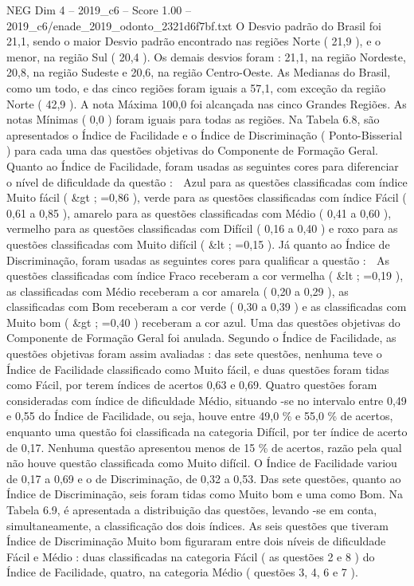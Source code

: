 \begin{textsample}{NEG Dim 4 – 2019\_c6 – Score 1.00 – 2019\_c6/enade\_2019\_odonto\_2321d6f7bf.txt}
O Desvio padrão do Brasil foi 21,1, sendo o maior Desvio padrão encontrado nas regiões Norte ( 21,9 ), e o menor, na região Sul ( 20,4 ).
Os demais desvios foram : 21,1, na região Nordeste, 20,8, na região Sudeste e 20,6, na região Centro-Oeste.
As Medianas do Brasil, como um todo, e das cinco regiões foram iguais a 57,1, com exceção da região Norte ( 42,9 ).
A nota Máxima 100,0 foi alcançada nas cinco Grandes Regiões.
As notas Mínimas ( 0,0 ) foram iguais para todas as regiões.
Na Tabela 6.8, são apresentados o Índice de Facilidade e o Índice de Discriminação ( Ponto-Bisserial ) para cada uma das questões objetivas do Componente de Formação Geral.
Quanto ao Índice de Facilidade, foram usadas as seguintes cores para diferenciar o nível de dificuldade da questão :  Azul para as questões classificadas com índice Muito fácil ( \&gt ; =0,86 ), verde para as questões classificadas com índice Fácil ( 0,61 a 0,85 ), amarelo para as questões classificadas com Médio ( 0,41 a 0,60 ), vermelho para as questões classificadas com Difícil ( 0,16 a 0,40 ) e roxo para as questões classificadas com Muito difícil ( \&lt ; =0,15 ).
Já quanto ao Índice de Discriminação, foram usadas as seguintes cores para qualificar a questão :  As questões classificadas com índice Fraco receberam a cor vermelha ( \&lt ; =0,19 ), as classificadas com Médio receberam a cor amarela ( 0,20 a 0,29 ), as classificadas com Bom receberam a cor verde ( 0,30 a 0,39 ) e as classificadas com Muito bom ( \&gt ; =0,40 ) receberam a cor azul.
Uma das questões objetivas do Componente de Formação Geral foi anulada.
Segundo o Índice de Facilidade, as questões objetivas foram assim avaliadas : das sete questões, nenhuma teve o Índice de Facilidade classificado como Muito fácil, e duas questões foram tidas como Fácil, por terem índices de acertos 0,63 e 0,69.
Quatro questões foram consideradas com índice de dificuldade Médio, situando -se no intervalo entre 0,49 e 0,55 do Índice de Facilidade, ou seja, houve entre 49,0 \% e 55,0 \% de acertos, enquanto uma questão foi classificada na categoria Difícil, por ter índice de acerto de 0,17.
Nenhuma questão apresentou menos de 15 \% de acertos, razão pela qual não houve questão classificada como Muito difícil.
O Índice de Facilidade variou de 0,17 a 0,69 e o de Discriminação, de 0,32 a 0,53.
Das sete questões, quanto ao Índice de Discriminação, seis foram tidas como Muito bom e uma como Bom.
Na Tabela 6.9, é apresentada a distribuição das questões, levando -se em conta, simultaneamente, a classificação dos dois índices.
As seis questões que tiveram Índice de Discriminação Muito bom figuraram entre dois níveis de dificuldade Fácil e Médio : duas classificadas na categoria Fácil ( as questões 2 e 8 ) do Índice de Facilidade, quatro, na categoria Médio ( questões 3, 4, 6 e 7 ).

\end{textsample}
